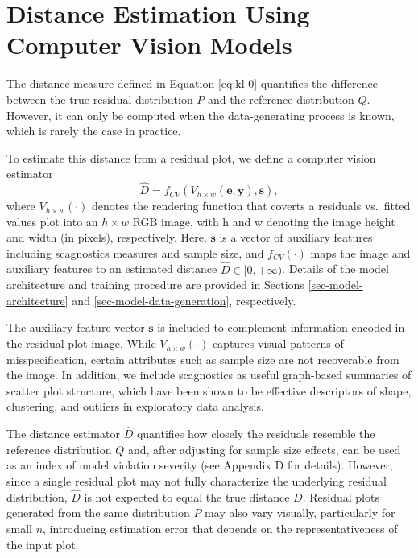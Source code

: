 \documentclass[]{interact}
\theoremstyle{plain}%
\theoremstyle{definition}
\theoremstyle{remark}
\begin{document}
\section{Distance Estimation Using Computer Vision
Models}\label{sec-model-distance-estimation}

The distance measure defined in Equation \ref{eq:kl-0} quantifies the
difference between the true residual distribution \(P\) and the
reference distribution \(Q\). However, it can only be computed when the
data-generating process is known, which is rarely the case in practice.

To estimate this distance from a residual plot, we define a computer
vision estimator \begin{equation*} \label{eq:d-approx}
\hat{D} = f_{CV}(V_{h \times w}(\boldsymbol{e}, \hat{\boldsymbol{y}}), \boldsymbol{s}),
\end{equation*} \noindent where \(V_{h \times w}(\cdot)\) denotes the
rendering function that coverts a residuals vs.~fitted values plot into
an \(h \times w\) RGB image, with h and w denoting the image height and
width (in pixels), respectively. Here, \(\boldsymbol{s}\) is a vector of
auxiliary features including scagnostics measures and sample size, and
\(f_{CV}(\cdot)\) maps the image and auxiliary features to an estimated
distance \(\hat{D} \in [0, +\infty)\). Details of the model architecture
and training procedure are provided in Sections
\ref{sec-model-architecture} and \ref{sec-model-data-generation},
respectively.

The auxiliary feature vector \(\boldsymbol{s}\) is included to
complement information encoded in the residual plot image. While
\(V_{h \times w}(\cdot)\) captures visual patterns of misspecification,
certain attributes such as sample size are not recoverable from the
image. In addition, we include scagnostics as useful graph-based
summaries of scatter plot structure, which have been shown to be
effective descriptors of shape, clustering, and outliers in exploratory
data analysis.

The distance estimator \(\hat{D}\) quantifies how closely the residuals
resemble the reference distribution \(Q\) and, after adjusting for
sample size effects, can be used as an index of model violation severity
(see Appendix D for details). However, since a single residual plot may
not fully characterize the underlying residual distribution, \(\hat{D}\)
is not expected to equal the true distance \(D\). Residual plots
generated from the same distribution \(P\) may also vary visually,
particularly for small \(n\), introducing estimation error that depends
on the representativeness of the input plot.
\end{document}
